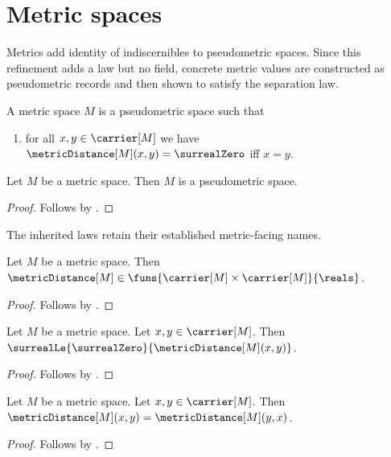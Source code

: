 


\section{Metric spaces}

Metrics add identity of indiscernibles to pseudometric spaces.  Since this
refinement adds a law but no field, concrete metric values are constructed as
pseudometric records and then shown to satisfy the separation law.

\begin{struct}\label{metric_space}
    A metric space $M$ is a pseudometric space such that
    \begin{enumerate}
        \item\label{metric_distance_zero_iff}
            for all $x,y\in\carrier[M]$ we have
                $\metricDistance[M](x,y)=\surrealZero$ iff $x=y$.
    \end{enumerate}
\end{struct}

\begin{classification}\label{metric_is_pseudometric_space}
    Let $M$ be a metric space.
    Then $M$ is a pseudometric space.
\end{classification}
\begin{proof}
    Follows by .
\end{proof}

The inherited laws retain their established metric-facing names.

\begin{proposition}\label{metric_distance_graph}
    Let $M$ be a metric space.
    Then $\metricDistance[M]\in
        \funs{\carrier[M]\times\carrier[M]}{\reals}$.
\end{proposition}
\begin{proof}
    Follows by .
\end{proof}

\begin{proposition}\label{metric_distance_nonnegative}
    Let $M$ be a metric space.
    Let $x,y\in\carrier[M]$.
    Then $\surrealLe{\surrealZero}{\metricDistance[M](x,y)}$.
\end{proposition}
\begin{proof}
    Follows by .
\end{proof}

\begin{proposition}\label{metric_distance_symmetric}
    Let $M$ be a metric space.
    Let $x,y\in\carrier[M]$.
    Then $\metricDistance[M](x,y)=\metricDistance[M](y,x)$.
\end{proposition}
\begin{proof}
    Follows by .
\end{proof}

